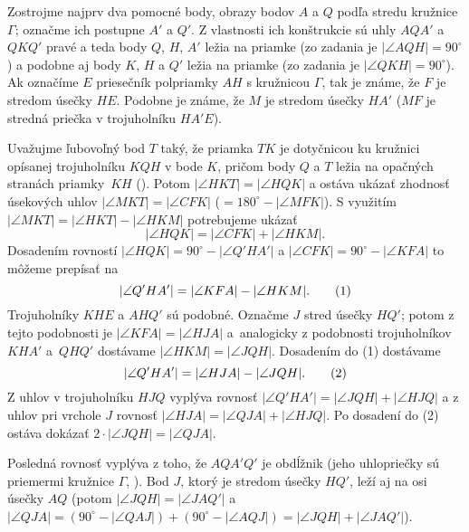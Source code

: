 {%
Zostrojme najprv dva pomocné body, obrazy bodov $A$ a $Q$ podľa stredu kružnice $\Gamma$; označme ich postupne $A'$ a $Q'$. Z vlastnosti ich konštrukcie sú uhly $AQA'$ a $QKQ'$ pravé a teda body $Q$, $H$, $A'$ ležia na priamke (zo zadania je $|\angle AQH|=90^\circ$) a podobne aj body $K$, $H$ a $Q'$ ležia na priamke (zo zadania je $|\angle QKH|=90^\circ$). Ak označíme $E$ priesečník polpriamky $AH$ s kružnicou $\Gamma$, tak je známe, že $F$ je stredom úsečky $HE$. Podobne je známe, že $M$ je stredom úsečky $HA'$ ($MF$ je stredná priečka v trojuholníku $HA'E$).
%

Uvažujme ľubovoľný bod $T$ taký, že priamka $TK$ je dotyčnicou ku kružnici opísanej trojuholníku $KQH$ v bode $K$, pričom body $Q$ a $T$ ležia na opačných stranách priamky~$KH$ (\obr). Potom $|\angle HKT|=|\angle HQK|$ a ostáva ukázať zhodnosť úsekových uhlov $|\angle MKT|=|\angle CFK|$ ($=180^\circ-|\angle MFK|$). S využitím $|\angle MKT|=|\angle HKT|-|\angle HKM|$ potrebujeme ukázať
$$
|\angle HQK|=|\angle CFK|+|\angle HKM|.
$$
Dosadením rovností $|\angle HQK|=90^\circ-|\angle Q'HA'|$ a $|\angle CFK|=90^\circ-|\angle KFA|$ to môžeme prepísať na
$$
|\angle Q'HA'|=|\angle KFA|-|\angle HKM|.
\tag1
$$
Trojuholníky $KHE$ a $AHQ'$ sú podobné. Označme $J$ stred úsečky $HQ'$; potom z tejto podobnosti je $|\angle KFA|=|\angle HJA|$ a~analogicky z podobnosti trojuholníkov $KHA'$ a~$QHQ'$ dostávame $|\angle HKM|=|\angle JQH|$. Dosadením do (1) dostávame
$$
|\angle Q'HA'|=|\angle HJA|-|\angle JQH|.
\tag2
$$
Z uhlov v trojuholníku $HJQ$ vyplýva rovnosť $|\angle Q'HA'|=|\angle JQH|+|\angle HJQ|$ a z uhlov pri vrchole $J$ rovnosť $|
\angle HJA|=|\angle QJA|+|\angle HJQ|$. Po dosadení do (2) ostáva dokázať $2\cdot|\angle JQH|=|\angle QJA|$.

Posledná rovnosť vyplýva z toho, že $AQA'Q'$ je obdĺžnik (jeho uhlopriečky sú priemermi kružnice $\Gamma$, \obr).
%
Bod $J$, ktorý je stredom úsečky $HQ'$, leží aj na osi úsečky $AQ$ (potom $|\angle JQH|=|\angle JAQ'|$ a $|\angle QJA|=(90^\circ-|\angle QAJ|)+(90^\circ-|\angle AQJ|)=|\angle JQH|+|\angle JAQ'|$).

}
